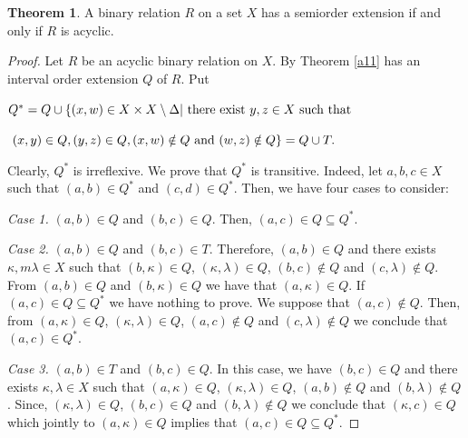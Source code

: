 \documentclass{article}
\theoremstyle{definition}
\newtheorem{theorem}{Theorem}[section]
\begin{document}
\begin{theorem}\label{awerr}{\rm 
A binary relation $R$ on a set $X$ has a
semiorder extension
if and only if $R$ is acyclic.}
\end{theorem}
\begin{proof} Let $R$ be an acyclic binary relation on $X$. By Theorem \ref{a11} has an interval
order extension $Q$ of $R$. Put
\begin{center}
$Q^{\ast}=Q\cup\{(x,w)\in X\times X\setminus \Delta \vert\ {\rm there\ exist}\ 
y, z\in X\ {\rm such\ that}$
\end{center}
\begin{center}
$\ (x,y)\in Q, (y,z)\in Q, (x,w)\notin Q\ {\rm and}\ 
(w,z)\notin Q\}=Q\cup T.$
\end{center}
Clearly, $Q^{\ast}$ is irreflexive. We prove that $Q^{\ast}$ is transitive.
Indeed, let $a, b, c\in X$ such that $(a,b)\in Q^{\ast}$ and $(c,d)\in Q^{\ast}$. Then,
we have four cases
to consider:
\par\smallskip\par\noindent
{\it Case 1.} $(a,b)\in Q$ and $(b,c)\in Q$. Then, $(a,c)\in Q\subseteq Q^{\ast}$. 
\par\smallskip\par\noindent
{\it Case 2.} $(a,b)\in Q$ and $(b,c)\in T$.
Therefore, $(a,b)\in Q$ and there exists $\kappa, m\lambda \in X$ such that 
$(b,\kappa)\in Q$, $(\kappa,\lambda)\in Q$, $(b,c)\notin Q$ and $(c,\lambda)\notin Q$.
From $(a,b)\in Q$ and $(b,\kappa)\in Q$ we have that $(a,\kappa)\in Q$.
If $(a,c)\in Q\subseteq Q^{\ast}$ we have nothing to prove. We suppose that $(a,c)\notin Q$.
Then, from $(a,\kappa)\in Q$, $(\kappa,\lambda)\in Q$, $(a,c)\notin Q$ and $(c,\lambda)\notin Q$ we conclude that $(a,c)\in Q^{\ast}$.
\par\smallskip\par\noindent
{\it Case 3.} $(a,b)\in T$ and $(b,c)\in Q$. In this case, we have $(b,c)\in Q$ and 
there exists 
$\kappa, \lambda \in X$ such that 
$(a,\kappa)\in Q$, $(\kappa,\lambda)\in Q$, $(a,b)\notin Q$ and $(b,\lambda)\notin Q$.
Since, $(\kappa,\lambda)\in Q$, $(b,c)\in Q$ and $(b,\lambda)\notin Q$ we conclude that 
$(\kappa,c)\in Q$ which jointly to $(a,\kappa)\in Q$ implies that $(a,c)\in Q\subseteq Q^{\ast}$.

\end{proof}
\end{document}
